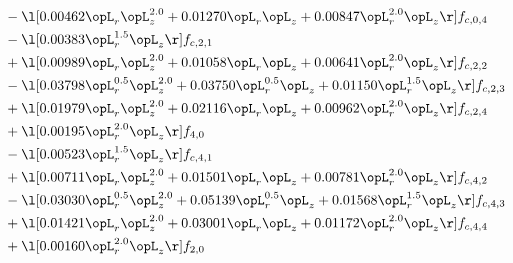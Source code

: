 \begin{alignat}{2}
& - \l[  0.00462 \opL_r \opL_z^{2.0} +  0.01270 \opL_r \opL_z +  0.00847 \opL_r^{2.0} \opL_z  \r] f_{c,0,4} \nonumber \\ 
& - \l[  0.00383 \opL_r^{1.5} \opL_z  \r] f_{c,2,1} \nonumber \\ 
& + \l[  0.00989 \opL_r \opL_z^{2.0} +  0.01058 \opL_r \opL_z +  0.00641 \opL_r^{2.0} \opL_z  \r] f_{c,2,2} \nonumber \\ 
& - \l[  0.03798 \opL_r^{0.5} \opL_z^{2.0} +  0.03750 \opL_r^{0.5} \opL_z +  0.01150 \opL_r^{1.5} \opL_z  \r] f_{c,2,3} \nonumber \\ 
& + \l[  0.01979 \opL_r \opL_z^{2.0} +  0.02116 \opL_r \opL_z +  0.00962 \opL_r^{2.0} \opL_z  \r] f_{c,2,4} \nonumber \\ 
& + \l[  0.00195 \opL_r^{2.0} \opL_z  \r] f_{4,0} \nonumber \\ 
& - \l[  0.00523 \opL_r^{1.5} \opL_z  \r] f_{c,4,1} \nonumber \\ 
& + \l[  0.00711 \opL_r \opL_z^{2.0} +  0.01501 \opL_r \opL_z +  0.00781 \opL_r^{2.0} \opL_z  \r] f_{c,4,2} \nonumber \\ 
& - \l[  0.03030 \opL_r^{0.5} \opL_z^{2.0} +  0.05139 \opL_r^{0.5} \opL_z +  0.01568 \opL_r^{1.5} \opL_z  \r] f_{c,4,3} \nonumber \\ 
& + \l[  0.01421 \opL_r \opL_z^{2.0} +  0.03001 \opL_r \opL_z +  0.01172 \opL_r^{2.0} \opL_z  \r] f_{c,4,4} \nonumber \\ 
& + \l[  0.00160 \opL_r^{2.0} \opL_z  \r] f_{2,0} \nonumber \\ 
\end{alignat} 


